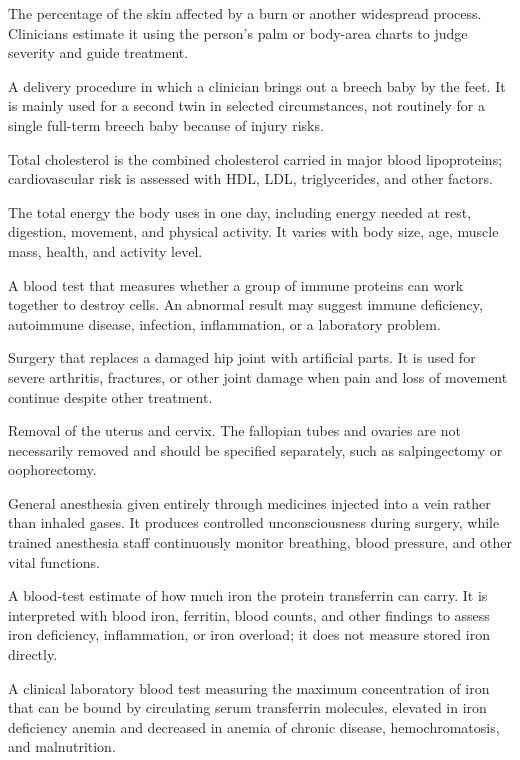  The percentage of the skin affected by a burn or another widespread process. Clinicians estimate it using the person’s palm or body-area charts to judge severity and guide treatment.

 A delivery procedure in which a clinician brings out a breech baby by the feet. It is mainly used for a second twin in selected circumstances, not routinely for a single full-term breech baby because of injury risks.

 Total cholesterol is the combined cholesterol carried in major blood lipoproteins; cardiovascular risk is assessed with HDL, LDL, triglycerides, and other factors.

 The total energy the body uses in one day, including energy needed at rest, digestion, movement, and physical activity. It varies with body size, age, muscle mass, health, and activity level.

 A blood test that measures whether a group of immune proteins can work together to destroy cells. An abnormal result may suggest immune deficiency, autoimmune disease, infection, inflammation, or a laboratory problem.

 Surgery that replaces a damaged hip joint with artificial parts. It is used for severe arthritis, fractures, or other joint damage when pain and loss of movement continue despite other treatment.

 Removal of the uterus and cervix. The fallopian tubes and ovaries are not necessarily removed and should be specified separately, such as salpingectomy or oophorectomy.

 General anesthesia given entirely through medicines injected into a vein rather than inhaled gases. It produces controlled unconsciousness during surgery, while trained anesthesia staff continuously monitor breathing, blood pressure, and other vital functions.

 A blood-test estimate of how much iron the protein transferrin can carry. It is interpreted with blood iron, ferritin, blood counts, and other findings to assess iron deficiency, inflammation, or iron overload; it does not measure stored iron directly.

 A clinical laboratory blood test measuring the maximum concentration of iron that can be bound by circulating serum transferrin molecules, elevated in iron deficiency anemia and decreased in anemia of chronic disease, hemochromatosis, and malnutrition.

